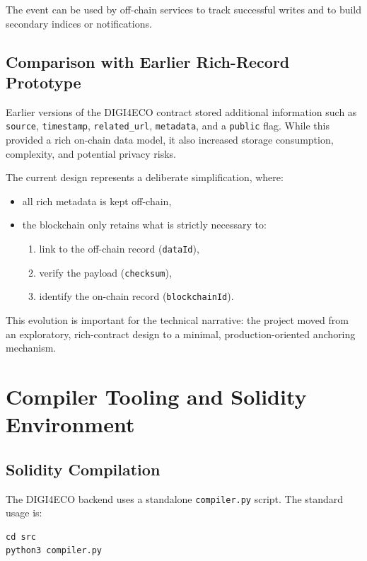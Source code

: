 \documentclass[11pt,a4paper]{article}
\begin{document}
The event can be used by off-chain services to track successful writes and to build secondary indices or notifications.

\subsection{Comparison with Earlier Rich-Record Prototype}

Earlier versions of the DIGI4ECO contract stored additional information such as \texttt{source}, \texttt{timestamp}, \texttt{related\_url}, \texttt{metadata}, and a \texttt{public} flag. While this provided a rich on-chain data model, it also increased storage consumption, complexity, and potential privacy risks.

The current design represents a deliberate simplification, where:

\begin{itemize}[noitemsep]
  \item all rich metadata is kept off-chain,
  \item the blockchain only retains what is strictly necessary to:
        \begin{enumerate}[noitemsep]
          \item link to the off-chain record (\texttt{dataId}),
          \item verify the payload (\texttt{checksum}),
          \item identify the on-chain record (\texttt{blockchainId}).
        \end{enumerate}
\end{itemize}

This evolution is important for the technical narrative: the project moved from an exploratory, rich-contract design to a minimal, production-oriented anchoring mechanism.

\section{Compiler Tooling and Solidity Environment}

\subsection{Solidity Compilation}

The DIGI4ECO backend uses a standalone \texttt{compiler.py} script. The standard usage is:

\begin{lstlisting}
cd src
python3 compiler.py
\end{lstlisting}
\end{document}
